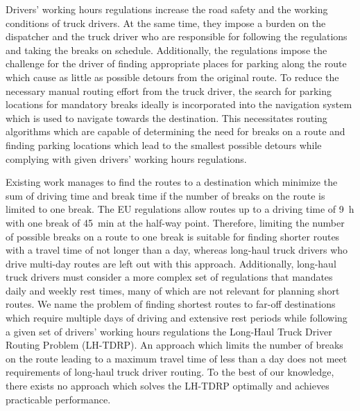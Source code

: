 Drivers' working hours regulations increase the road safety and the working conditions of truck drivers. At the same time, they impose a burden on the dispatcher and the truck driver who are responsible for following the regulations and taking the breaks on schedule. Additionally, the regulations impose the challenge for the driver of finding appropriate places for parking along the route which cause as little as possible detours from the original route. To reduce the necessary manual routing effort from the truck driver, the search for parking locations for mandatory breaks ideally is incorporated into the navigation system which is used to navigate towards the destination. This necessitates routing algorithms which are capable of determining the need for breaks on a route and finding parking locations which lead to the smallest possible detours while complying with given drivers' working hours regulations.

Existing work manages to find the routes to a destination which minimize the sum of driving time and break time if the number of breaks on the route is limited to one break. The EU regulations allow routes up to a driving time of \SI{9}{\hour} with one break of \SI{45}{\minute} at the half-way point. Therefore, limiting the number of possible breaks on a route to one break is suitable for finding shorter routes with a travel time of not longer than a day, whereas long-haul truck drivers who drive multi-day routes are left out with this approach. Additionally, long-haul truck drivers must consider a more complex set of regulations that mandates daily and weekly rest times, many of which are not relevant for planning short routes. We name the problem of finding shortest routes to far-off destinations which require multiple days of driving and extensive rest periods while following a given set of drivers' working hours regulations the Long-Haul Truck Driver Routing Problem (LH-TDRP). An approach which limits the number of breaks on the route leading to a maximum travel time of less than a day does not meet requirements of long-haul truck driver routing. To the best of our knowledge, there exists no approach which solves the LH-TDRP optimally and achieves practicable performance.

